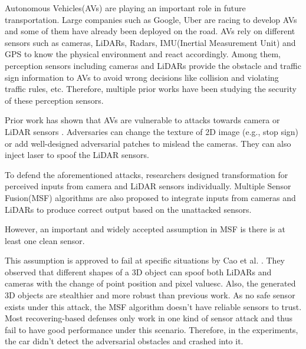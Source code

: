 
Autonomous Vehicles(AVs) are playing an important role in
future transportation. Large companies such as Google,
Uber\cite{1} are racing to develop AVs and some of them have already been deployed on the road. 
AVs rely on different sensors\cite{17} such as cameras, LiDARs, Radars, IMU(Inertial
Measurement Unit) and GPS to know the physical environment and react accordingly. Among them, perception sensors
including cameras and LiDARs provide the obstacle and traffic sign information to AVs to avoid wrong decisions like
collision and violating traffic rules, etc. Therefore, multiple
prior works have been studying the security of these perception sensors.

Prior work has shown that AVs are vulnerable to attacks
towards camera \cite{7, 9, 23} or LiDAR sensors \cite{4, 6, 19, 25}.
Adversaries can change the texture of 2D image \cite{23}(e.g.,
stop sign) or add well-designed adversarial patches\cite{9} to
mislead the cameras. They can also inject laser\cite{6} to spoof
the LiDAR sensors.

To defend the aforementioned attacks, researchers designed
transformation for perceived inputs from camera\cite{13} and LiDAR\cite{22} sensors individually. Multiple Sensor Fusion(MSF)
algorithms are also proposed to integrate inputs from cameras and LiDARs to produce correct output based on the
unattacked sensors.

However, an important and widely accepted assumption in
MSF is there is at least one clean sensor\cite{msf-adv}.

This assumption is approved to fail at specific situations
by Cao et al. \cite{msf-adv}. They observed that different shapes of a 3D
object can spoof both LiDARs and cameras with the change
of point position and pixel valuesc\cite{msf-adv}. Also, the generated 3D
objects are stealthier and more robust than previous work. As
no safe sensor exists under this attack, the MSF algorithm doesn’t
have reliable sensors to trust. Most recovering-based defenses only work in one kind of sensor attack and thus fail to
have good performance under this scenario. Therefore, 
in the experiments, the car didn’t detect the adversarial obstacles and crashed into it.

